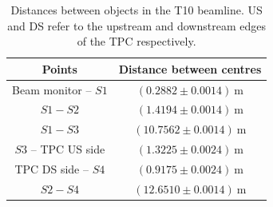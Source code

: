 \begin{table}
  \centering
  \caption{Distances between objects in the T10 beamline. US and DS refer to the upstream and downstream edges of the TPC respectively.}
  \begin{tabular}{|c|c|}
    \hline
    Points & Distance between centres\\
    \hline
    Beam monitor -- $\mathit{S1}$ & $(0.2882 \pm 0.0014)~\text{m}$ \\
    $\mathit{S1}-\mathit{S2}$ & $(1.4194 \pm 0.0014)~\text{m}$ \\
    $\mathit{S1}-\mathit{S3}$ & $(10.7562 \pm 0.0014)~\text{m}$ \\
    $\mathit{S3}$ -- TPC US side & $(1.3225 \pm 0.0024)~\text{m}$ \\
    TPC DS side -- $\mathit{S4}$ & $(0.9175 \pm 0.0024)~\text{m}$ \\
    $\mathit{S2}-\mathit{S4}$ & $(12.6510 \pm 0.0014)~\text{m}$ \\
    \hline    
  \end{tabular}
  \label{tab:distances}
\end{table}


